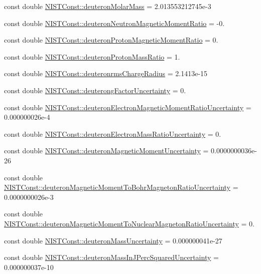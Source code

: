 \begin{DoxyCompactItemize}
\item 
const double \hyperlink{group___deuteron_ga19086965236aae3504b4c0efb1cfaf41}{N\+I\+S\+T\+Const\+::deuteron\+Molar\+Mass} = 2.\+013553212745e-\/3
\item 
const double \hyperlink{group___deuteron_gaad8a0231ec17f5669c9c22a4daba5a77}{N\+I\+S\+T\+Const\+::deuteron\+Neutron\+Magnetic\+Moment\+Ratio} = -\/0.
\item 
const double \hyperlink{group___deuteron_gaac523a6a3c61390396544e4b0acb3c05}{N\+I\+S\+T\+Const\+::deuteron\+Proton\+Magnetic\+Moment\+Ratio} = 0.
\item 
const double \hyperlink{group___deuteron_gabe2731d4997c2227da2cc2d7e7cda194}{N\+I\+S\+T\+Const\+::deuteron\+Proton\+Mass\+Ratio} = 1.
\item 
const double \hyperlink{group___deuteron_gaef4ebab0e996f7ac1934663efbd32aed}{N\+I\+S\+T\+Const\+::deuteronrms\+Charge\+Radius} = 2.\+1413e-\/15
\item 
const double \hyperlink{group___deuteron_ga78aec37c148d141458e1a01ddf0f7366}{N\+I\+S\+T\+Const\+::deuterong\+Factor\+Uncertainty} = 0.
\item 
const double \hyperlink{group___deuteron_ga7f8d57d07179574f57434689cf15f711}{N\+I\+S\+T\+Const\+::deuteron\+Electron\+Magnetic\+Moment\+Ratio\+Uncertainty} = 0.\+000000026e-\/4
\item 
const double \hyperlink{group___deuteron_gaf463ddb812e8768a0519d741b15aa97f}{N\+I\+S\+T\+Const\+::deuteron\+Electron\+Mass\+Ratio\+Uncertainty} = 0.
\item 
const double \hyperlink{group___deuteron_ga410ac4c31ff98d05fb7e548b5508c981}{N\+I\+S\+T\+Const\+::deuteron\+Magnetic\+Moment\+Uncertainty} = 0.\+0000000036e-\/26
\item 
const double \hyperlink{group___deuteron_gac689dcb4af65af6e079aebd27f6d1c47}{N\+I\+S\+T\+Const\+::deuteron\+Magnetic\+Moment\+To\+Bohr\+Magneton\+Ratio\+Uncertainty} = 0.\+0000000026e-\/3
\item 
const double \hyperlink{group___deuteron_gaa04ee8eb2fdfbc5cbf37a9d5e751c36a}{N\+I\+S\+T\+Const\+::deuteron\+Magnetic\+Moment\+To\+Nuclear\+Magneton\+Ratio\+Uncertainty} = 0.
\item 
const double \hyperlink{group___deuteron_ga70a72db5719cf2c6966086755689b0dd}{N\+I\+S\+T\+Const\+::deuteron\+Mass\+Uncertainty} = 0.\+000000041e-\/27
\item 
const double \hyperlink{group___deuteron_ga03d5482fc1395d5d86ad8f8dfa068898}{N\+I\+S\+T\+Const\+::deuteron\+Mass\+In\+J\+Perc\+Squared\+Uncertainty} = 0.\+000000037e-\/10

\end{DoxyCompactItemize}
